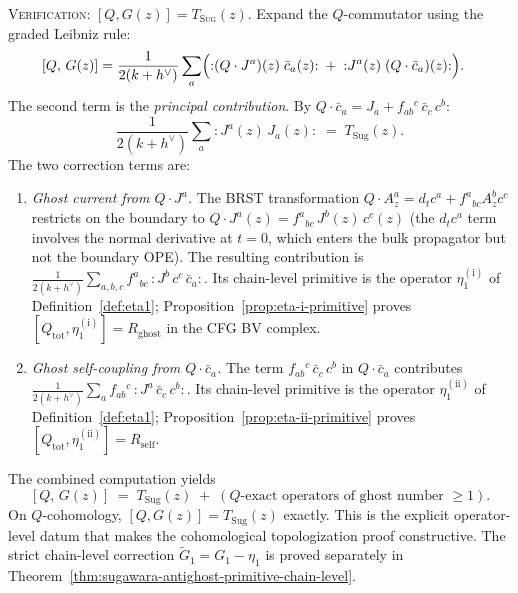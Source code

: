 \begin{construction}
\textsc{Verification: $[Q, G(z)] = T_{\mathrm{Sug}}(z)$.}
Expand the $Q$-commutator using the graded Leibniz rule:
\begin{align}
\label{eq:QG-expansion}
[Q,\, G(z)]
&= \frac{1}{2(k+h^\vee)} \sum_a
 \Bigl(
 {:}(Q \cdot J^a)(z)\;\bar c_a(z){:}
 \;+\;
 {:}J^a(z)\;(Q \cdot \bar c_a)(z){:}
 \Bigr).
\end{align}
The second term is the \emph{principal contribution}. By
$Q \cdot \bar c_a = J_a + f_{ab}{}^c\,\bar c_c\, c^b$:
\begin{equation}\label{eq:principal-term}
\frac{1}{2(k+h^\vee)} \sum_a {:}J^a(z)\,J_a(z){:}
\;=\; T_{\mathrm{Sug}}(z).
\end{equation}
The two correction terms are:
\begin{enumerate}[label=\textup{(\roman*)}]
\item \emph{Ghost current from $Q \cdot J^a$.}
 The BRST transformation $Q \cdot A_z^a = d_t c^a + f^a{}_{bc}
 A_z^b c^c$ restricts on the boundary to
 $Q \cdot J^a(z) = f^a{}_{bc}\,J^b(z)\,c^c(z)$ \textup{(}the
 $d_t c^a$ term involves the normal derivative at $t = 0$, which
 enters the bulk propagator but not the boundary OPE\textup{)}. The
 resulting contribution is
 $\frac{1}{2(k+h^\vee)}\sum_{a,b,c} f^a{}_{bc}\,
 {:}J^b\, c^c\, \bar c_a{:}$.
 Its chain-level primitive is the operator
 $\eta_1^{(\mathrm i)}$ of Definition~\ref{def:eta1};
 Proposition~\ref{prop:eta-i-primitive} proves
 $[Q_{\mathrm{tot}},\eta_1^{(\mathrm i)}]=R_{\mathrm{ghost}}$
 in the CFG BV complex.
\item \emph{Ghost self-coupling from $Q \cdot \bar c_a$.}
 The term $f_{ab}{}^c\,\bar c_c\, c^b$ in $Q \cdot \bar c_a$
 contributes
 $\frac{1}{2(k+h^\vee)}\sum_a f_{ab}{}^c\,
 {:}J^a\, \bar c_c\, c^b{:}$.
 Its chain-level primitive is the operator
 $\eta_1^{(\mathrm{ii})}$ of Definition~\ref{def:eta1};
 Proposition~\ref{prop:eta-ii-primitive} proves
 $[Q_{\mathrm{tot}},\eta_1^{(\mathrm{ii})}]=R_{\mathrm{self}}$.
\end{enumerate}
The combined computation yields
\begin{equation}\label{eq:TQG-result}
[Q,\, G(z)] \;=\; T_{\mathrm{Sug}}(z) \;+\;
 (\text{$Q$-exact operators of ghost number $\ge 1$}).
\end{equation}
On $Q$-cohomology, $[Q, G(z)] = T_{\mathrm{Sug}}(z)$ exactly. This is
the explicit operator-level datum that makes the cohomological
topologization proof constructive. The strict chain-level correction
$\widetilde G_1 = G_1-\eta_1$ is proved separately in
Theorem~\ref{thm:sugawara-antighost-primitive-chain-level}.


\end{construction}
